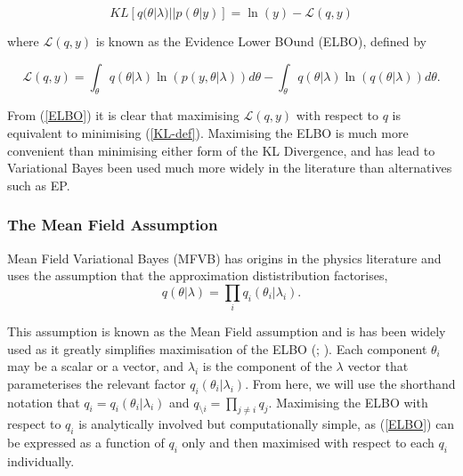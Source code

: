 \documentclass{article}\usepackage[]{graphicx}\usepackage[]{color}
\numberwithin{equation}{section}
\begin{document}
\begin{equation}
\label{KL-ELBO}
KL[q(\theta | \lambda)||p(\theta | y)] = \ln(y) - \mathcal{L}(q, y)
\end{equation}

where $\mathcal{L}(q, y)$ is known as the Evidence Lower BOund (ELBO), defined by

\begin{equation}
\label{ELBO}
\mathcal{L}(q, y) = \int_{\theta} q(\theta|\lambda) \ln (p(y, \theta|\lambda)) d\theta -  \int_{\theta} q(\theta|\lambda) \ln (q(\theta|\lambda)) d\theta.
\end{equation}

From (\ref{ELBO}) it is clear that maximising $\mathcal{L}(q, y)$ with respect to $q$ is equivalent to minimising (\ref{KL-def}). Maximising the ELBO is much more convenient than minimising either form of the KL Divergence, and has lead to Variational Bayes been used much more widely in the literature than alternatives such as EP.

\subsubsection{The Mean Field Assumption} 

Mean Field Variational Bayes (MFVB) has origins in the physics literature \citep{Chandler1987} and uses the assumption that the approximation dististribution factorises, 
\begin{equation}
\label{mf1}
q(\theta|\lambda) = \prod_i q_i(\theta_i | \lambda_i).
\end{equation}

This assumption is known as the Mean Field assumption and is has been widely used as it greatly simplifies maximisation of the ELBO (\citealp{Jordan1999}; \citealp{Bishop2006}). Each component $\theta_i$ may be a scalar or a vector, and $\lambda_i$ is the component of the $\lambda$ vector that parameterises the relevant factor $q_i(\theta_i |\lambda_i)$. From here, we will use the shorthand notation that $q_i = q_i(\theta_i|\lambda_i)$ and $q_{\setminus i} = \prod_{j\neq i}q_j$. Maximising the ELBO with respect to $q_i$ is analytically involved but computationally simple, as (\ref{ELBO}) can be expressed as a function of $q_i$ only and then maximised with respect to each $q_i$ individually.
\end{document}
